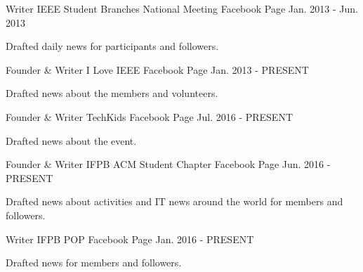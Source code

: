 

\begin{cventries}

  \cventry
    {Writer} %
    {IEEE Student Branches National Meeting} %
    {Facebook Page} %
    {Jan. 2013 - Jun. 2013} %
    {
      \begin{cvitems} %
        \item {Drafted daily news for participants and followers.}
      \end{cvitems}
    }
    
  \cventry
    {Founder \& Writer} %
    {I Love IEEE} %
    {Facebook Page} %
    {Jan. 2013 - PRESENT} %
    {
      \begin{cvitems} %
        \item {Drafted news about the members and volunteers.}
      \end{cvitems}
    }
    
  \cventry
    {Founder \& Writer} %
    {TechKids} %
    {Facebook Page} %
    {Jul. 2016 - PRESENT} %
    {
      \begin{cvitems} %
        \item {Drafted news about the event.}
      \end{cvitems}
    }
    
  \cventry
    {Founder \& Writer} %
    {IFPB ACM Student Chapter} %
    {Facebook Page} %
    {Jun. 2016 - PRESENT} %
    {
      \begin{cvitems} %
        \item {Drafted news about activities and IT news around the world for members and followers.}
      \end{cvitems}
    }
    
  \cventry
    {Writer} %
    {IFPB POP} %
    {Facebook Page} %
    {Jan. 2016 - PRESENT} %
    {
      \begin{cvitems} %
        \item {Drafted news for members and followers.}
      \end{cvitems}
    }


\end{cventries}
